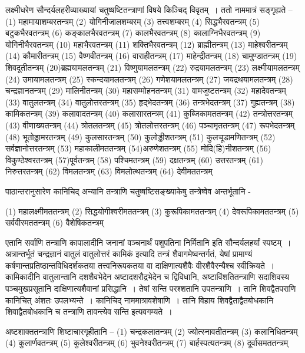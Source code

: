 {लक्ष्मीधरेण सौन्दर्यलहरीव्याख्यायां चतुष्षष्टितन्त्राणां विषये किञ्चिद् विवृतम्~। ततो नाममात्रं सङ्गृह्यते –
(1) महामायाशम्बरतन्त्रम् (2) योगिनीजालशम्बरम् (3) तत्त्वशम्बरम् (4) सिद्धभैरवतन्त्रम् (5) बटुकभैरवतन्त्रम् (6) कङ्कालभैरवतन्त्रम् (7) कालभैरवतन्त्रम् (8) कालाग्निभैरवतन्त्रम् (9) योगिनीभैरवतन्त्रम् (10) महाभैरवतन्त्रम् (11) शक्तिभैरवतन्त्रम् (12) ब्राह्मीतन्त्रम् (13) माहेश्वरीतन्त्रम् (14) कौमारीतन्त्रम् (15) वैष्णवीतन्त्रम् (16) वाराहीतन्त्रम् (17) माहेन्द्रीतन्त्रम् (18) चामुण्डातन्त्रम् (19) शिवदूतीतन्त्रम् (20)ब्रह्मयामलतन्त्रम् (21) विष्णुयामलतन्त्रम् (22) रुद्रयामलतन्त्रम् (23) लक्ष्मीयामलतन्त्रम् (24) उमायामलतन्त्रम् (25) स्कन्दयामलतन्त्रम् (26) गणेशयामलतन्त्रम् (27) जयद्रथयामलतन्त्रम् (28) चन्द्रज्ञानतन्त्रम् (29) मालिनीतन्त्रम् (30) महासम्मोहनतन्त्रम् (31) वामजुष्टतन्त्रम् (32) महादेवतन्त्रम् (33) वातुलतन्त्रम् (34) वातुलोत्तरतन्त्रम् (35) हृद्भेदतन्त्रम् (36) तन्त्रभेदतन्त्रम् (37) गुह्यतन्त्रम् (38) कामिकतन्त्रम् (39) कलावादतन्त्रम् (40) कलासारतन्त्रम् (41) कुब्जिकामततन्त्रम् (42) तन्त्रोत्तरतन्त्रम् (43) वीणाख्यतन्त्रम् (44) त्रोतलतन्त्रम् (45) त्रोतलोत्तरतन्त्रम् (46) पञ्चामृततन्त्रम् (47) रूपभेदतन्त्रम् (48) भूतोड्डामरतन्त्रम् (49) कुलसारतन्त्रम् (50) कुलोड्डीशतन्त्रम् (51) कुलचूडामणितन्त्रम् (52) सर्वज्ञानोत्तरतन्त्रम् (53) महाकालीमततन्त्रम् (54)अरुणेशतन्त्रम् (55) मोदि(हि)नीशतन्त्रम् (56) विकुण्ठेश्वरतन्त्रम् (57)पूर्वतन्त्रम् (58) पश्चिमतन्त्रम् (59) दक्षतन्त्रम् (60) उत्तरतन्त्रम् (61) निरुत्तरतन्त्रम् (62) विमलतन्त्रम् (63) विमलोत्थतन्त्रम् (64) देवीमततन्त्रम्

पाठान्तरानुसारेण कानिचिद् अन्यानि तन्त्राणि चतुष्षष्टिसङ्ख्याकेषु तन्त्रेष्वेव अन्तर्भूतानि -

(1) महालक्ष्मीमततन्त्रम् 	(2) 	सिद्धयोगीश्वरीमततन्त्रम् 	(3) 	कुरूपिकामततन्त्रम् 	(4) 	देवरूपिकामततन्त्रम् 	(5) 	सर्ववीरमततन्त्रम् 	(6) 	वैशेषिकतन्त्रम्

एतानि सर्वाणि तन्त्राणि कापालादीनि जनानां वञ्चनार्थं पशुपतिना निर्मितानि इति सौन्दर्यलहर्यां स्पष्टम्~। अत्रान्तर्भूतं चन्द्रज्ञानं वातुलं वातुलोत्तरं कामिकं इत्यादि तन्त्रं शैवागमेष्वन्तर्गतं, येषां प्रामाण्यं कर्षणान्तप्रतिष्ठान्तविधिदर्शकतया तत्त्वनिरूपकतया वा दाक्षिणात्यशैवैः वीरशैवैरन्यैश्च स्वीक्रियते~। कामिकादीनि वातुलान्तानि दशशैवभेदेन अष्टादशरौद्रभेदेन च द्विविधानि, अष्टाविंशतितन्त्राणि सदाशिवस्य पञ्चमुखप्रसूतानि दाक्षिणात्यशैवानां प्रसिद्धानि~। तेषां सन्ति परश्शतानि उपतन्त्राणि~। तानि शिवद्वैतपराणि कानिचित् अंशतः उपलभ्यन्ते~। कानिचिद् नाममात्रावशेषाणि~। तानि विहाय शिवद्वैताद्वैतबोधकानि शिवाद्वैतबोधकानि च तन्त्राणि तावन्त्येव सन्ति इत्यवगम्यते~। 

अष्टशाक्ततन्त्राणि शिष्टाचारगृहीतानि – (1) चन्द्रकलातन्त्रम् (2) ज्योत्स्नावतीतन्त्रम् (3) कलानिधितन्त्रम् (4) कुलार्णवतन्त्रम् (5) कुलेश्वरीतन्त्रम् (6) भुवनेश्वरीतन्त्रम् (7) बार्हस्पत्यतन्त्रम् (8) दूर्वासमततन्त्रम्

}
